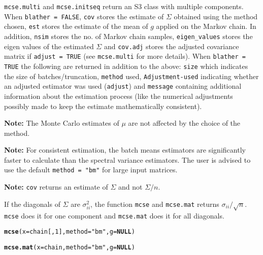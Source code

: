 \documentclass[11pt]{article}\usepackage[]{graphicx}\usepackage[]{color}
\makeatletter
\newcommand{\hlnum}[1]{\textcolor[rgb]{0.686,0.059,0.569}{#1}}%
\newcommand{\hlstr}[1]{\textcolor[rgb]{0.192,0.494,0.8}{#1}}%
\newcommand{\hlstd}[1]{\textcolor[rgb]{0.345,0.345,0.345}{#1}}%
\newcommand{\hlkwa}[1]{\textcolor[rgb]{0.161,0.373,0.58}{\textbf{#1}}}%
\newcommand{\hlkwc}[1]{\textcolor[rgb]{0.333,0.667,0.333}{#1}}%
\newcommand{\hlkwd}[1]{\textcolor[rgb]{0.737,0.353,0.396}{\textbf{#1}}}%
\newenvironment{kframe}{%
 \def\at@end@of@kframe{}%
 \ifinner\ifhmode%
  \def\at@end@of@kframe{\end{minipage}}%
  \begin{minipage}{\columnwidth}%
 \fi\fi%
 \def\FrameCommand##1{\hskip\@totalleftmargin \hskip-\fboxsep
 \colorbox{shadecolor}{##1}\hskip-\fboxsep
     \hskip-\linewidth \hskip-\@totalleftmargin \hskip\columnwidth}%
 \MakeFramed {\advance\hsize-\width
   \@totalleftmargin\z@ \linewidth\hsize
   \@setminipage}}%
 {\par\unskip\endMakeFramed%
 \at@end@of@kframe}
\newenvironment{knitrout}{}{} %
\makeatother
\begin{document}
\texttt{mcse.multi} and \texttt{mcse.initseq} return an S3 class with multiple components. When \texttt{blather = FALSE}, \texttt{cov} stores the estimate of $\Sigma$ obtained using the method chosen, \texttt{est} stores the estimate of the mean of $g$ applied on the Markov chain. In addition, \texttt{nsim} stores the no. of Markov chain samples, \texttt{eigen\_values} stores the eigen values of the estimated $\Sigma$ and \texttt{cov.adj} stores the adjusted covariance matrix if \texttt{adjust = TRUE} (see \texttt{mcse.multi} for more details). When \texttt{blather = TRUE} the following are returned in addition to the above: \texttt{size} which indicates the size of batches/truncation, \texttt{method} used, \texttt{Adjustment-used} indicating whether an adjusted estimator was used (\texttt{adjust}) and \texttt{message} containing additional information about the estimation process (like the numerical adjustments possibly made to keep the estimate mathematically consistent).


  
\bigskip  
  
\textbf{Note: } The Monte Carlo estimates of $\mu$ are not affected by the choice of the method.

\bigskip
\textbf{Note: } For consistent estimation, the batch means estimators are significantly faster to calculate than the spectral variance estimators. The user is advised to use the default \texttt{method = "bm"} for large input matrices.

\bigskip
\textbf{Note: }\texttt{cov} returns an estimate of $\Sigma$ and not $\Sigma/n$. 

\bigskip
If the diagonals of $\Sigma$ are $\sigma_{ii}^2$, the function \texttt{mcse} and \texttt{mcse.mat} returns $\sigma_{ii}/\sqrt{n}$. \texttt{mcse} does it for one component and \texttt{mcse.mat} does it for all diagonals.


\begin{knitrout}
\color{fgcolor}\begin{kframe}
\begin{alltt}
\hlkwd{mcse}\hlstd{(}\hlkwc{x} \hlstd{= chain[,}\hlnum{1}\hlstd{],} \hlkwc{method} \hlstd{=} \hlstr{"bm"}\hlstd{,} \hlkwc{g} \hlstd{=} \hlkwa{NULL}\hlstd{)}
\end{alltt}


{\ttfamily\noindent\bfseries{}}\begin{alltt}
\hlkwd{mcse.mat}\hlstd{(}\hlkwc{x} \hlstd{= chain,} \hlkwc{method} \hlstd{=} \hlstr{"bm"}\hlstd{,} \hlkwc{g} \hlstd{=} \hlkwa{NULL}\hlstd{)}
\end{alltt}


{\ttfamily\noindent\bfseries{}}\end{kframe}
\end{knitrout}
  
\end{document}
